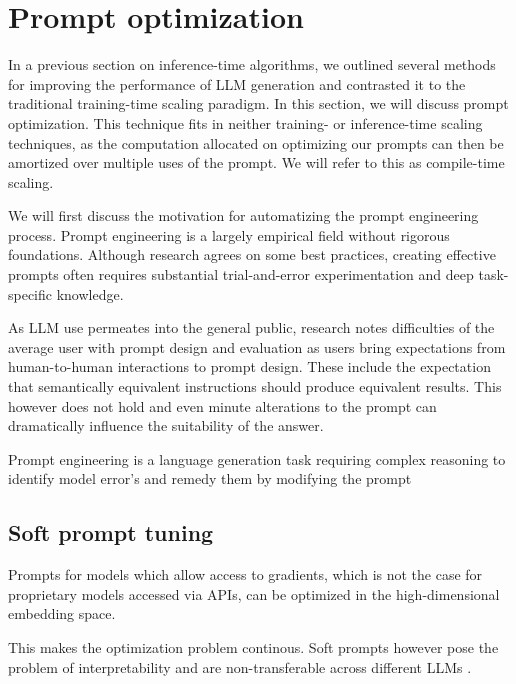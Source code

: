 \section{Prompt optimization}
In a previous section on inference-time algorithms, we outlined several methods for improving the performance of LLM generation
and contrasted it to the traditional training-time scaling paradigm. In this section, we will discuss prompt optimization. 
This technique fits in neither training- or inference-time scaling techniques, as the computation allocated on
optimizing our prompts can then be amortized over multiple uses of the prompt. 
We will refer to this as compile-time\cite{schnabel2024symbolicpromptprogramsearch} scaling.

We will first discuss the motivation for automatizing the prompt engineering process. 
Prompt engineering is a largely empirical field without rigorous foundations.
Although research agrees on some best practices, creating effective prompts 
often requires substantial trial-and-error experimentation and deep task-specific 
knowledge\cite{xiang2025selfsupervisedpromptoptimization}.

As LLM use permeates into the general public, research\cite{10.1145/3544548.3581388} notes difficulties 
of the average user with prompt design and evaluation as users bring expectations from human-to-human 
interactions to prompt design. These include the expectation that semantically equivalent instructions 
should produce equivalent results. This however does not hold and even minute
alterations to the prompt can dramatically influence the suitability of the answer\cite{zhuo2024prosaassessingunderstandingprompt}.



Prompt engineering is a language generation task requiring complex 
reasoning to identify model error's and remedy them by modifying the prompt \cite{ye2024promptengineeringpromptengineer}




\subsection{Soft prompt tuning}
Prompts for models which allow access to gradients, which is not the case for proprietary models accessed via APIs, can be optimized in the high-dimensional embedding space.

This makes the optimization problem continous. Soft prompts however pose the problem of interpretability and are non-transferable across different LLMs \cite{deng2022rlpromptoptimizingdiscretetext}.

